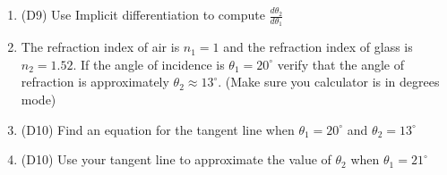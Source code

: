 \documentclass[12pt]{article}
\begin{document}
\begin{enumerate}
\begin{enumerate}
        \item (D9) Use Implicit differentiation to compute $\displaystyle{\frac{d\theta_2}{d\theta_1}}$
        \item The refraction index of air is $n_1=1$ and the refraction index of glass is $n_2=1.52$. 
        If the angle of incidence is $\theta_1=20^\circ$ verify that the angle 
        of refraction is approximately $\theta_2\approx 13^\circ$. 
        (Make sure you calculator is in degrees mode)
        \item (D10) Find an equation for the tangent line when $\theta_1=20^\circ$ and $\theta_2= 13^\circ$
        \item (D10) Use your tangent line to approximate the value of $\theta_2$ when $\theta_1=21^\circ$
\end{enumerate}



 \end{enumerate}

\newpage
\end{document}
